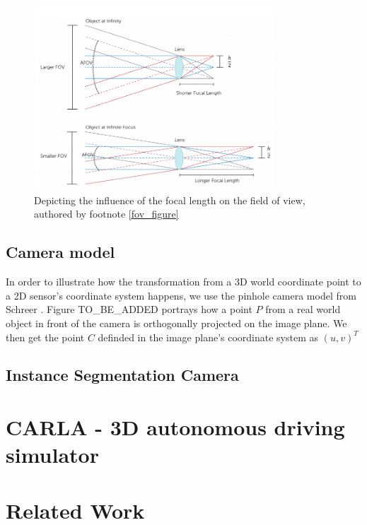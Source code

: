 \begin{figure}
\centering
\includegraphics[width=0.8\textwidth]{images/camera_fov.png}
\caption[Single camera's FoV]{Depicting the influence of the focal length on the field of view, authored by footnote \ref{fov_figure} \label{fig:camera_fov}}
\end{figure}

\subsection{Camera model}\label{camera_model}
In order to illustrate how the transformation from a 3D world coordinate point to a 2D sensor's coordinate system happens, we use the pinhole camera model from Schreer \cite{camera_pinhole_model}. Figure TO\_BE\_ADDED portrays how a point $P$ from a real world object in front of the camera is orthogonally projected on the image plane. We then get the point $C$ definded in the image plane's coordinate system as $(u,v)^{T}$

\subsection{Instance Segmentation Camera}\label{instance_camera}

\section{CARLA - 3D autonomous driving simulator}\label{carla_background}

\section{Related Work}